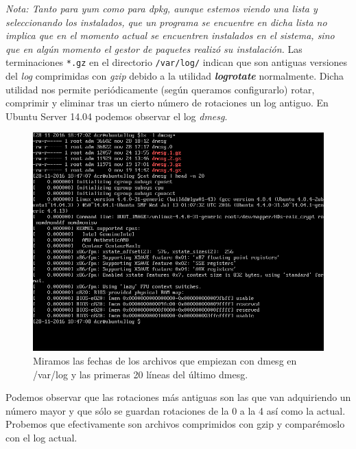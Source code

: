 \textit{Nota: Tanto para yum como para dpkg, aunque estemos viendo una lista y \linebreak seleccionando los instalados, que un programa se encuentre en dicha lista \linebreak no implica que en el momento actual se encuentren instalados en el sistema, sino que en algún momento el gestor de paquetes realizó su instalación.}
\linebreak\linebreak
Las terminaciones \verb|*.gz| en el directorio \verb|/var/log/| indican que son antiguas versiones del \textit{log} comprimidas con \textit{gzip} debido a la utilidad \textbf{\textit{logrotate}} \cite{c1b} normalmente. Dicha utilidad nos permite periódicamente (según queramos configurarlo) rotar, comprimir y eliminar tras un cierto número de rotaciones un log antiguo. En Ubuntu Server 14.04 podemos observar el log \textit{dmesg}.

\begin{figure}[H]
	\centering
	\includegraphics[scale=0.4]{dmesg.png}
	\caption{Miramos las fechas de los archivos que empiezan con dmesg en /var/log y las primeras 20 líneas del último dmesg.}
\end{figure}

Podemos observar que las rotaciones más antiguas son las que van adquiriendo un número mayor y que sólo se guardan rotaciones de la 0 a la 4 así como la actual.
Probemos que efectivamente son archivos comprimidos con gzip y comparémoslo con el log actual.

